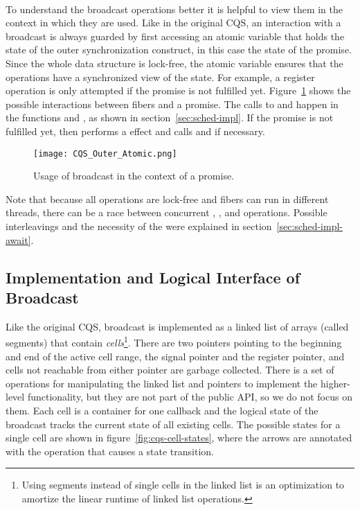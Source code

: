 \paragraph*{}
To understand the broadcast operations better it is helpful to view them in the context in which they are used.
Like in the original CQS, an interaction with a broadcast is always guarded by first accessing an atomic variable that holds the state of the outer synchronization construct, in this case the state of the promise.
Since the whole data structure is lock-free, the atomic variable ensures that the operations have a synchronized view of the state.
For example, a register operation is only attempted if the promise is not fulfilled yet.
Figure~\ref{fig:cqs-usage} shows the possible interactions between fibers and a promise.
The calls to  and  happen in the functions  and , as shown in section~\ref{sec:sched-impl}.
If the promise is not fulfilled yet,  then performs a \esuspend{} effect and calls  and  if necessary.

\begin{figure}[ht]
  \texttt{[image: CQS\_Outer\_Atomic.png]}
  \caption{Usage of broadcast in the context of a promise.}
  \label{fig:cqs-usage}
\end{figure}

Note that because all operations are lock-free and fibers can run in different threads, there can be a race between concurrent , , and  operations.
Possible interleavings and the necessity of the  were explained in section~\ref{sec:sched-impl-await}.

\subsection{Implementation and Logical Interface of Broadcast}
\label{sec:broadcast-impl}


Like the original CQS, broadcast is implemented as a linked list of arrays (called segments) that contain \emph{cells}\footnote{Using segments instead of single cells in the linked list is an optimization to amortize the linear runtime of linked list operations.}.
There are two pointers pointing to the beginning and end of the active cell range, the signal pointer and the register pointer, and cells not reachable from either pointer are garbage collected.
There is a set of operations for manipulating the linked list and pointers to implement the higher-level functionality, but they are not part of the public API, so we do not focus on them.
Each cell is a container for one callback and the logical state of the broadcast tracks the current state of all existing cells.
The possible states for a single cell are shown in figure~\ref{fig:cqs-cell-states}, where the arrows are annotated with the operation that causes a state transition.

